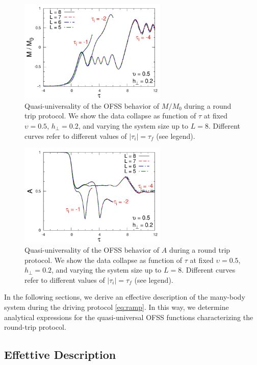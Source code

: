 \begin{figure}[t]
\centering
\includegraphics[width=7cm]{imm/Mt2u500g2diffti.pdf}
\caption{Quasi-universality of the OFSS behavior of $M/M_0$ during a round trip protocol. We show the data collapse as function of $\tau$ at fixed $\upsilon=0.5$, $h_\perp=0.2$, and varying the system size up to $L=8$. Different curves refer to different values of $|\tau_i|=\tau_f$ (see legend).}\label{fig:dependence-ti-M}
\end{figure}
\begin{figure}[t]
\centering
\includegraphics[width=7cm]{imm/At2u500g2diffti.pdf}
\caption{Quasi-universality of the OFSS behavior of $A$ during a round trip protocol. We show the data collapse as function of $\tau$ at fixed $\upsilon=0.5$, $h_\perp=0.2$, and varying the system size up to $L=8$. Different curves refer to different values of $|\tau_i|=\tau_f$ (see legend).}\label{fig:dependence-ti-A}
\end{figure}
In the following sections, we derive an effective description of the many-body system during the driving protocol \eqref{eq:ramp}. In this way, we determine analytical expressions for the quasi-universal OFSS functions characterizing the round-trip protocol.







\subsection{Effettive Description}


